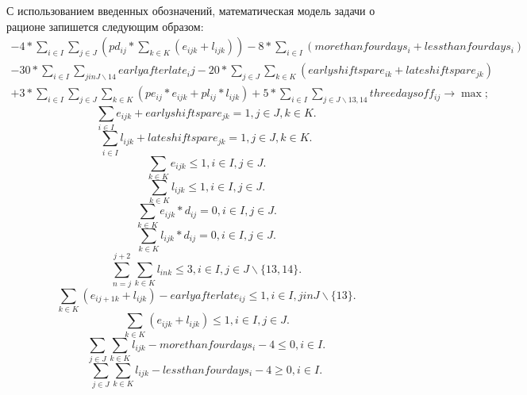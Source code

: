 \documentclass[]{article}
\begin{document}
С использованием введенных обозначений, математическая модель задачи о рационе
запишется следующим образом:
\begin{eqnarray}
-4 * \sum_{i\in I}\sum_{j\in J}(pd_{ij}*\sum_{k \in K}(e_{ijk}+l_{ijk}))
-8 * \sum_{i\in I}(morethanfourdays_i+lessthanfourdays_i) \\ \nonumber
-30 * \sum_{i\in I}\sum_{j in J\backslash{14}} earlyafterlate_ij
-20 * \sum_{j \in J}\sum_{k \in K} (earlyshiftspare_{ik} + lateshiftspare_{jk}) \\ \nonumber
+ 3 * \sum_{i \in I}\sum_{j \in J}\sum_{k \in K} (pe_{ij}*e_{ijk} + pl_{ij}*l_{ijk})
+ 5 * \sum_{i \in I}\sum_{j \in J\backslash{13,14}} threedaysoff_{ij}\rightarrow\max;
\end{eqnarray}
\begin{equation}
  \sum_{i \in I} e_{ijk} + earlyshiftspare_{jk} = 1, j \in J, k \in K.
\end{equation}
\begin{equation}
  \sum_{i \in I} l_{ijk} + lateshiftspare_{jk} = 1, j \in J, k \in K.
\end{equation}
\begin{equation}
  \sum_{k \in K} e_{ijk} \leq 1, i \in I, j \in J.
\end{equation}
\begin{equation}
  \sum_{k \in K} l_{ijk} \leq 1, i \in I, j \in J.
\end{equation}
\begin{equation}
  \sum_{k \in K} e_{ijk}*d_{ij} = 0, i \in I, j \in J.
\end{equation}
\begin{equation}
  \sum_{k \in K} l_{ijk}*d_{ij} = 0, i \in I, j \in J.
\end{equation}
\begin{equation}
  \sum_{n = j}^{j+2}\sum_{k \in K} l_{ink} \leq 3, i \in I, j \in J\backslash\{13,14\}.
\end{equation}
\begin{equation}
  \sum_{k \in K} (e_{i j+1 k} + l_{ijk})
              - earlyafterlate_{ij} \leq 1, i \in I, j in J\backslash\{13\}.
\end{equation}
\begin{equation}
  \sum_{k \in K} (e_{ijk}+l_{ijk}) \leq 1, i \in I, j \in J.
\end{equation}
\begin{equation}
  \sum_{j \in J}\sum_{k \in K} l_{ijk} - morethanfourdays_{i} - 4 \leq 0, i \in I.
\end{equation}
\begin{equation}
  \sum_{j \in J}\sum_{k \in K} l_{ijk} - lessthanfourdays_{i} - 4 \geq 0, i \in I.
\end{equation}
\end{document}

